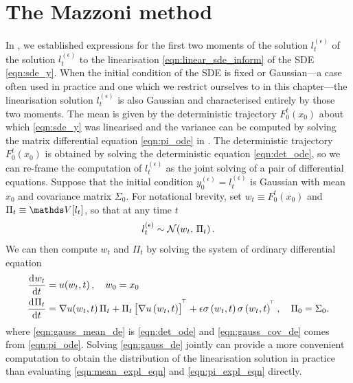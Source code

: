 \section{The Mazzoni method}\label{sec:mazzoni}
In , we established expressions for the first two moments of the solution \(l_t^{(\epsilon)}\) of the solution \(l_t^{(\epsilon)}\) to the linearisation \cref{eqn:linear_sde_inform} of the SDE \cref{eqn:sde_y}.
When the initial condition of the SDE is fixed or Gaussian---a case often used in practice and one which we restrict ourselves to in this chapter---the linearisation solution \(l_t^{(\epsilon)}\) is also Gaussian and characterised entirely by those two moments.
The mean is given by the deterministic trajectory \(F_0^t\!\left(x_0\right)\) about which \cref{eqn:sde_y} was linearised and the variance can be computed by solving the matrix differential equation \cref{eqn:pi_ode} in .
The deterministic trajectory \(F_0^t\!\left(x_0\right)\) is obtained by solving the deterministic equation \cref{eqn:det_ode}, so we can re-frame the computation of \(l_t^{(\epsilon)}\) as the joint solving of a pair of differential equations.
Suppose that the initial condition \(y_0^{(\epsilon)} = l_t^{(\epsilon)}\) is Gaussian with mean \(x_0\) and covariance matrix \(\Sigma_0\).
For notational brevity, set \(w_t \equiv F_0^t\!\left(x_0\right)\) and \(\Pi_t \equiv \var{l_t}\), so that at any time \(t\)
\[
	l_t^{(\epsilon)} \sim\mathcal{N}\!\left(w_t, \, \Pi_t\right).
\]
We can then compute \(w_t\) and \(\Pi_t\) by solving the system of ordinary differential equation
\begin{subequations}\label{eqn:gauss_de}
	\begin{align}
		\dod{w_t}{t}   & = u\!\left(w_t, t\right), \quad w_0 = x_0 \label{eqn:gauss_mean_de}                                                                                                                    \\
		\dod{\Pi_t}{t} & = \begin{multlined}[t]
			                   \nabla u\!\left(w_t, t\right) \Pi_t + \Pi_t\left[\nabla u\left(w_t, t\right)\right]^{\T} + \epsilon \sigma\left(w_t, t \right)\sigma\left(w_t, t\right)^{\T}, \quad \Pi_0 = \Sigma_0.
		                   \end{multlined}
		\label{eqn:gauss_cov_de}
	\end{align}
\end{subequations}
where \cref{eqn:gauss_mean_de} is \cref{eqn:det_ode} and \cref{eqn:gauss_cov_de} comes from \cref{eqn:pi_ode}.
Solving \cref{eqn:gauss_de} jointly can provide a more convenient computation to obtain the distribution of the linearisation solution in practice than evaluating \cref{eqn:mean_expl_eqn} and \cref{eqn:pi_expl_eqn} directly.


